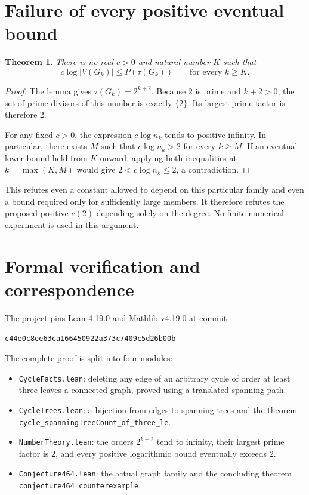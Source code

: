 \documentclass[11pt]{article}
\newtheorem{theorem}{Theorem}
\begin{document}
\section{Failure of every positive eventual bound}
\begin{theorem}
There is no real $c>0$ and natural number $K$ such that
\[
 c\log |V(G_k)|\le P(\tau(G_k))\qquad\text{for every }k\ge K.
\]
\end{theorem}
\begin{proof}
The lemma gives $\tau(G_k)=2^{k+2}$. Because $2$ is prime and $k+2>0$, the set of prime divisors of this number is exactly $\{2\}$. Its largest prime factor is therefore $2$.

For any fixed $c>0$, the expression $c\log n_k$ tends to positive infinity. In particular, there exists $M$ such that $c\log n_k>2$ for every $k\ge M$. If an eventual lower bound held from $K$ onward, applying both inequalities at $k=\max(K,M)$ would give $2<c\log n_k\le2$, a contradiction.
\end{proof}
This refutes even a constant allowed to depend on this particular family and even a bound required only for sufficiently large members. It therefore refutes the proposed positive $c(2)$ depending solely on the degree. No finite numerical experiment is used in this argument.
\newpage

\section{Formal verification and correspondence}
The project pins Lean 4.19.0 and Mathlib v4.19.0 at commit
\begin{center}\small\texttt{c44e0c8ee63ca166450922a373c7409c5d26b00b}\end{center}
The complete proof is split into four modules:
\begin{itemize}
\item \texttt{CycleFacts.lean}: deleting any edge of an arbitrary cycle of order at least three leaves a connected graph, proved using a translated spanning path.
\item \texttt{CycleTrees.lean}: a bijection from edges to spanning trees and the theorem\\
\texttt{cycle\_spanningTreeCount\_of\_three\_le}.
\item \texttt{NumberTheory.lean}: the orders $2^{k+2}$ tend to infinity, their largest prime factor is $2$, and every positive logarithmic bound eventually exceeds $2$.
\item \texttt{Conjecture464.lean}: the actual graph family and the concluding theorem\\
\texttt{conjecture464\_counterexample}.
\end{itemize}
\end{document}
